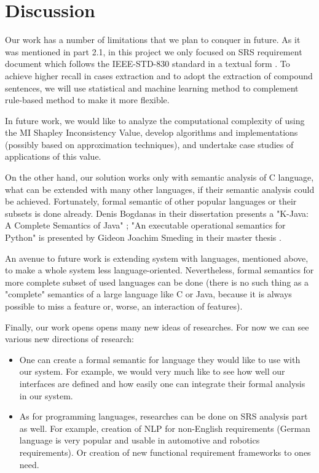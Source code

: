\section{Discussion}
\begin{minipage}{\linewidth}
	\begin{multicols*}{2}
		Our work has a number of limitations that we plan to conquer in future. As it was mentioned in part 2.1, in this project we only focused on SRS requirement document which follows the IEEE-STD-830 standard in a textual form \cite{kutmod}.
		To achieve higher recall in cases extraction and to adopt the extraction of compound sentences, we will use statistical and machine learning method to complement rule-based method to make it more flexible. 
		
		In future work, we would like to analyze the computational complexity of using the MI Shapley Inconsistency Value, develop algorithms and implementations (possibly based on approximation techniques), and undertake case studies of applications of this value.
		
		On the other hand, our solution works only with semantic analysis of C language, what can be extended with many other languages, if their semantic analysis could be achieved. Fortunately, formal semantic of other popular languages or their subsets is done already. Denis Bogdanas in their dissertation presents a "K-Java: A Complete Semantics of Java" \cite{10.1145/2775051.2676982}; "An executable operational semantics for Python" is presented by Gideon Joachim Smeding in their master thesis \cite{phdthesis}. 
		
		An avenue to future work is extending system with languages, mentioned above, to make a whole system less language-oriented. Nevertheless, formal semantics for more complete subset of used languages can be done (there is no such thing as a "complete" semantics of a large language like C or Java, because it is always possible to miss a feature or, worse, an interaction of features).
		
		Finally, our work opens opens many new ideas of researches. For now we can see various new directions of research:
		\begin{itemize}
			\item One can create a formal semantic for language they would like to use with our system. For example, we would very much like to see how well our interfaces are defined and how easily one can integrate their formal analysis in our system.
			\item As for programming languages, researches can be done on SRS analysis part as well. For example, creation of \gls{NLP} for non-English requirements (German language is very popular and usable in automotive and robotics requirements). Or creation of new functional requirement frameworks to ones need.
		\end{itemize} 
	\end{multicols*}
\end{minipage}
